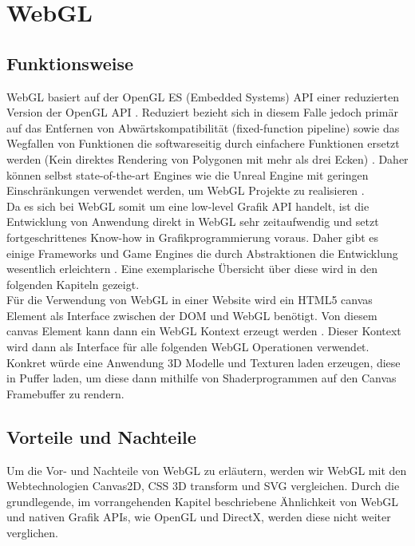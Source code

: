 \section{WebGL}
\subsection{Funktionsweise}
WebGL basiert auf der OpenGL ES (Embedded Systems) API \cite{parisi2012webgl} einer reduzierten Version der OpenGL API \cite{KhronosGLES}. Reduziert bezieht sich in diesem Falle jedoch primär auf das Entfernen von Abwärtskompatibilität (\zb fixed-function pipeline) sowie das Wegfallen von Funktionen die softwareseitig durch einfachere Funktionen ersetzt werden (\zb Kein direktes Rendering von Polygonen mit mehr als drei Ecken) \cite{DiffGLES}. Daher können selbst state-of-the-art Engines wie die Unreal Engine mit geringen Einschränkungen verwendet werden, um WebGL Projekte zu realisieren \cite{UnrealHTML5}\cite{UnrealLimits}. \\
Da es sich bei WebGL somit um eine low-level Grafik API handelt, ist die Entwicklung von Anwendung direkt in WebGL sehr zeitaufwendig und setzt fortgeschrittenes Know-how in Grafikprogrammierung voraus. Daher gibt es einige Frameworks und Game Engines die durch Abstraktionen die Entwicklung wesentlich erleichtern \cite{parisi2012webgl}. Eine exemplarische Übersicht über diese wird in den folgenden Kapiteln gezeigt. \\
Für die Verwendung von WebGL in einer Website wird ein HTML5 canvas Element als Interface zwischen der \ac{DOM} und WebGL benötigt. Von diesem canvas Element kann dann ein WebGL Kontext erzeugt werden \cite{parisi2012webgl}. Dieser Kontext wird dann als Interface für alle folgenden WebGL Operationen verwendet. Konkret würde eine Anwendung 3D Modelle und Texturen laden \bzw erzeugen, diese in Puffer laden, um diese dann mithilfe von Shaderprogrammen auf den Canvas Framebuffer zu rendern. 
\subsection{Vorteile und Nachteile}
Um die Vor- und Nachteile von WebGL zu erläutern, werden wir WebGL mit den Webtechnologien Canvas2D, CSS 3D transform und SVG vergleichen. Durch die grundlegende, im vorrangehenden Kapitel beschriebene Ähnlichkeit von WebGL und nativen Grafik APIs, wie OpenGL und DirectX, werden diese nicht weiter verglichen.

